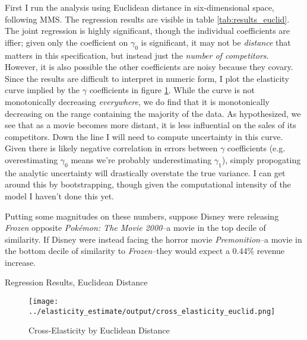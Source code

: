 \documentclass{article}
\begin{document}
First I run the analysis using Euclidean distance in six-dimensional space, following MMS. The regression results are visible in table \ref{tab:results_euclid}. The joint regression is highly significant, though the individual coefficients are iffier; given only the coefficient on $\gamma_0$ is significant, it may not be \emph{distance} that matters in this specification, but instead just the \emph{number of competitors}. However, it is also possible the other coefficients are noisy because they covary. Since the results are difficult to interpret in numeric form, I plot the elasticity curve implied by the $\gamma$ coefficients in figure \ref{fig:cross_elasticity_euclid}. While the curve is not monotonically decreasing \emph{everywhere}, we do find that it is monotonically decreasing on the range containing the majority of the data. As hypothesized, we see that as a movie becomes more distant, it is less influential on the sales of its competitors. Down the line I will need to compute uncertainty in this curve. Given there is likely negative correlation in errors between $\gamma$ coefficients (e.g. overestimating $\gamma_0$ means we're probably underestimating $\gamma_1$), simply propogating the analytic uncertainty will drastically overstate the true variance. I can get around this by bootstrapping, though given the computational intensity of the model I haven't done this yet. 

Putting some magnitudes on these numbers, suppose Disney were releasing \emph{Frozen} opposite \emph{Pok\'emon: The Movie 2000}--a movie in the top decile of similarity. If Disney were instead facing the horror movie \emph{Premonition}--a movie in the bottom decile of similarity to \emph{Frozen}--they would expect a 0.44\% revenue increase. 

\begin{table}
    \begin{center}
    

    \caption{Regression Results, Euclidean Distance}
    \label{tab:results_euclid}
    \end{center}
\end{table}

\begin{figure}
    \begin{center}
    \texttt{[image: ../elasticity\_estimate/output/cross\_elasticity\_euclid.png]}
    \caption{Cross-Elasticity by Euclidean Distance}
    \label{fig:cross_elasticity_euclid}
    \end{center}
\end{figure}
\end{document}
